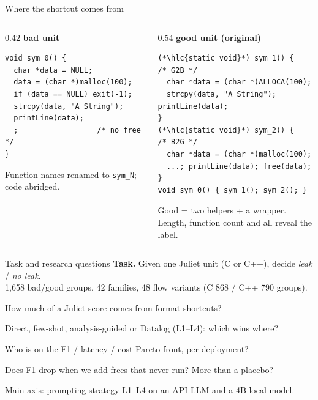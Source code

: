 \begin{frame}[fragile]{Where the shortcut comes from}
  \begin{columns}[T]
    \begin{column}{0.42\textwidth}
      \textbf{bad unit}\\[1pt]
\begin{lstlisting}[style=unit]
void sym_0() {
  char *data = NULL;
  data = (char *)malloc(100);
  if (data == NULL) exit(-1);
  strcpy(data, "A String");
  printLine(data);
  ;                  /* no free */
}
\end{lstlisting}
      \vspace{2pt}
      {\small Function names renamed to \texttt{sym\_N}; code abridged.}
    \end{column}
    \begin{column}{0.54\textwidth}
      \textbf{good unit (original)}\\[1pt]
\begin{lstlisting}[style=unit]
(*\hlc{static void}*) sym_1() {        /* G2B */
  char *data = (char *)ALLOCA(100);
  strcpy(data, "A String"); printLine(data);
}
(*\hlc{static void}*) sym_2() {        /* B2G */
  char *data = (char *)malloc(100);
  ...; printLine(data); free(data);
}
void sym_0() { sym_1(); sym_2(); }
\end{lstlisting}
      {\small Good = two  helpers + a wrapper.\\
      Length, function count and  all reveal the label.}
    \end{column}
  \end{columns}
\end{frame}

\begin{frame}{Task and research questions}
  \textbf{Task.} Given one Juliet unit (C or C++), decide \emph{leak} / \emph{no leak}.\\
  {\small 1,658 bad/good groups, 42 families, 48 flow variants (C 868 / C++ 790 groups).}
  \vspace{2pt}
  \begin{description}[RQ4~Robustness]
    \item[RQ1 Validity] How much of a Juliet score comes from format shortcuts?
    \item[RQ2 Strategy] Direct, few-shot, analysis-guided or Datalog (L1--L4): which wins where?
    \item[RQ3 Efficiency] Who is on the F1 / latency / cost Pareto front, per deployment?
    \item[RQ4 Robustness] Does F1 drop when we add frees that never run? More than a placebo?
  \end{description}
  \vfill
  {\small Main axis: prompting strategy L1--L4 on an API LLM and a 4B local model.}
\end{frame}
